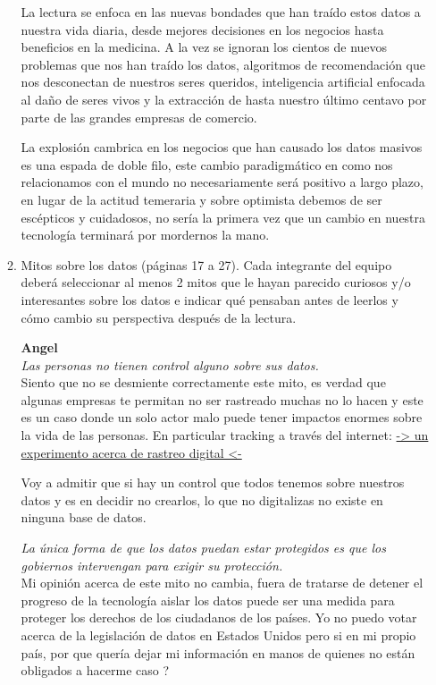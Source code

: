 \documentclass[11pt,letterpaper]{article}
\begin{document}
\begin{enumerate}
\begin{enumerate}
				La lectura se enfoca en las nuevas bondades que han traído
				estos datos a nuestra vida diaria, desde mejores decisiones en los
				negocios hasta beneficios en la medicina.
				A la vez se ignoran los cientos de nuevos problemas que nos han traído
				los datos, algoritmos de recomendación que nos desconectan de nuestros
				seres queridos, inteligencia artificial enfocada al daño de seres
				vivos y la extracción de hasta nuestro último centavo por parte
				de las grandes empresas de comercio.

				La explosión cambrica en los negocios que han causado
				los datos masivos es una espada de doble filo, este cambio
				paradigmático en como nos relacionamos con el mundo no necesariamente
				será positivo a largo plazo, en lugar de la actitud temeraria y
				sobre optimista debemos de ser escépticos y cuidadosos, no
				sería la primera vez que un cambio en nuestra tecnología
				terminará por mordernos la mano.

			\item Mitos sobre los datos (páginas 17 a 27). Cada integrante del equipo deberá seleccionar al menos 2
				mitos que le hayan parecido curiosos y/o interesantes sobre los datos e indicar qué pensaban antes de
				leerlos y cómo cambio su perspectiva después de la lectura.

				\textbf{Angel}\\
				\textit{Las personas no tienen control alguno sobre sus datos.}\\

				Siento que no se desmiente correctamente este
				mito, es verdad que algunas empresas te permitan
				no ser rastreado muchas no lo hacen y este es
				un caso donde un solo actor malo
				puede tener impactos enormes sobre la vida de
				las personas. En particular tracking
				a través del internet: \href{https://coveryourtracks.eff.org/}{-> un experimento acerca de rastreo digital <-}

				Voy a admitir que si hay un control que todos
				tenemos sobre nuestros datos y es en decidir no
				crearlos, lo que no digitalizas no existe
				en ninguna base de datos.

				\textit{La única forma de que los datos puedan estar protegidos es que
				los gobiernos intervengan para exigir su protección.}\\

				Mi opinión acerca de este mito no cambia,
				fuera de tratarse de detener el progreso de la tecnología
				aislar los datos puede ser una medida para proteger los
				derechos de los ciudadanos de los países.
				Yo no puedo votar acerca de la legislación de datos
				en Estados Unidos pero si en mi propio país, por que
				quería dejar mi información en manos de quienes no
				están obligados a hacerme caso ?

		\end{enumerate}

\end{enumerate}
\end{document}
